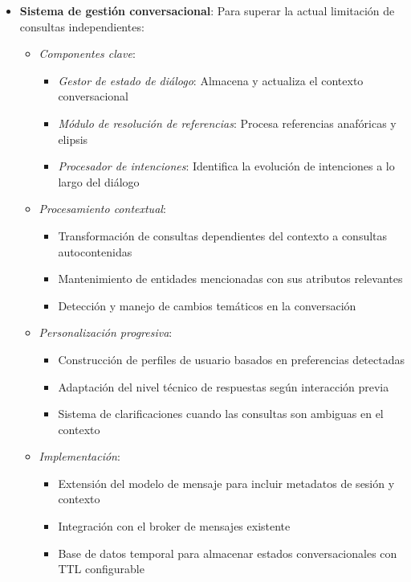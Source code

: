 \documentclass[runningheads]{llncs}
\begin{document}
\begin{itemize}
  \item \textbf{Sistema de gestión conversacional}: Para superar la actual limitación de consultas independientes:
  \begin{itemize}
    \item \textit{Componentes clave}:
    \begin{itemize}
      \item \textit{Gestor de estado de diálogo}: Almacena y actualiza el contexto conversacional
      \item \textit{Módulo de resolución de referencias}: Procesa referencias anafóricas y elipsis
      \item \textit{Procesador de intenciones}: Identifica la evolución de intenciones a lo largo del diálogo
    \end{itemize}
    
    \item \textit{Procesamiento contextual}:
    \begin{itemize}
      \item Transformación de consultas dependientes del contexto a consultas autocontenidas
      \item Mantenimiento de entidades mencionadas con sus atributos relevantes
      \item Detección y manejo de cambios temáticos en la conversación
    \end{itemize}
    
    \item \textit{Personalización progresiva}:
    \begin{itemize}
      \item Construcción de perfiles de usuario basados en preferencias detectadas
      \item Adaptación del nivel técnico de respuestas según interacción previa
      \item Sistema de clarificaciones cuando las consultas son ambiguas en el contexto
    \end{itemize}
    
    \item \textit{Implementación}:
    \begin{itemize}
      \item Extensión del modelo de mensaje para incluir metadatos de sesión y contexto
      \item Integración con el broker de mensajes existente
      \item Base de datos temporal para almacenar estados conversacionales con TTL configurable
    \end{itemize}
  \end{itemize}
\end{itemize}
\end{document}
